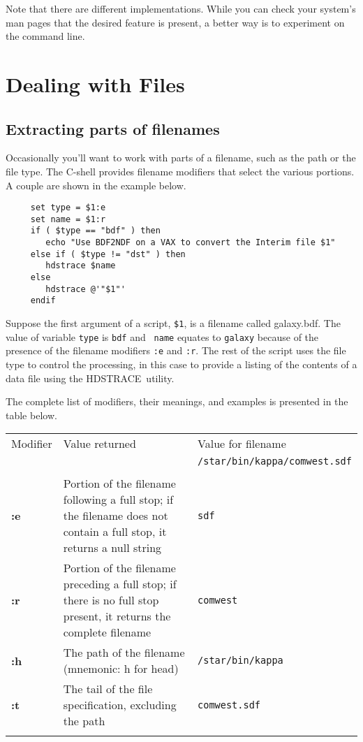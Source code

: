 \documentclass[twoside,11pt]{article}
\newcommand{\xref}[3]{#1}
\newcommand{\xlabel}[1]{}
\newcommand{\HDSTRACEref}{\xref{{\footnotesize HDSTRACE}\normalsize}{sun102}{}}
\begin{document}
Note that there are different implementations.  While you can check
your system's man pages that the desired feature is present, a better
way is to experiment on the command line.

\newpage
\section{\xlabel{sc4_se_files}Dealing with Files\label{sc4_se_files}}


\subsection{\xlabel{sc4_se_filename_ext}Extracting parts of filenames
\label{sc4_se_filename_ext}}

Occasionally you'll want to work with parts of a filename, such as the
path or the file type.  The C-shell provides {\sf filename modifiers}
that select the various portions.  A couple are shown in the example
below.

\small
\begin{verbatim}
     set type = $1:e
     set name = $1:r
     if ( $type == "bdf" ) then
        echo "Use BDF2NDF on a VAX to convert the Interim file $1"
     else if ( $type != "dst" ) then
        hdstrace $name
     else
        hdstrace @'"$1"'
     endif
\end{verbatim}
\normalsize

Suppose the first argument of a script, {\tt \$1}, is a filename called
galaxy.bdf.  The value of variable {\tt type} is {\tt bdf} and {\tt
name} equates to {\tt galaxy} because of the presence of the filename
modifiers {\tt :e} and {\tt :r}.  The rest of the script uses the 
file type to control the processing, in this case to provide a listing
of the contents of a data file using the \HDSTRACEref\normalsize\ utility.

The complete list of modifiers, their meanings, and examples is
presented in the table below.
\bigskip

\begin{center}
\begin{tabular}{lp{62mm}l}
Modifier & Value returned & Value for filename \\
 & & {\tt /star/bin/kappa/comwest.sdf} \\ \hline
\\
{\bf :e} & Portion of the filename following a full stop; if the filename does
not contain a full stop, it returns a null string & {\tt sdf} \\
{\bf :r} & Portion of the filename preceding a full stop; if there is no full stop
present, it returns the complete filename & {\tt comwest} \\
{\bf :h} & The path of the filename (mnemonic: h for head) & {\tt /star/bin/kappa} \\
{\bf :t} & The tail of the file specification, excluding the path &
                                         {\tt comwest.sdf} \\ 
\\ \hline
\end{tabular}
\end{center}
\medskip
\end{document}
